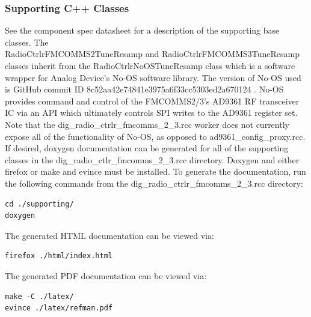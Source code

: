 \documentclass{article}
\def\comp{dig\_radio\_ctrlr\_fmcomms\_2\_3}
\begin{document}
    \subsubsection{Supporting C++ Classes}
      See the component spec
      datasheet \cite{dig_radio_ctrlr_comp_datasheet}
      for a description of the supporting base classes.
      The \\ RadioCtrlrFMCOMMS2TuneResamp and
      RadioCtrlrFMCOMMS3TuneResamp classes inherit from the
      RadioCtrlrNoOSTuneResamp class which is
      a software wrapper for Analog Device's No-OS software
      library\cite{no_os}.
      The version of No-OS used is GitHub commit ID
      8c52aa42e74841e3975a6f33cc5303ed2a670124 \cite{no_os_8c52aa42e74841e3975a6f33cc5303ed2a670124}.
      No-OS provides command and control of the FMCOMMS2/3's AD9361
      RF transceiver IC\cite{ad9361} via an
      API which ultimately controls SPI writes to the
      AD9361 register
      set. Note that the \comp.rcc worker does not currently
      expose all of the
      functionality
      of No-OS, as opposed to
      ad9361\_config\_proxy.rcc\cite{ad9361_config_proxy_datasheet}.
    If desired, doxygen documentation can be generated for all
    of the supporting classes in the dig\_radio\_ctlr\_fmcomms\_2\_3.rcc
    directory. Doxygen and
    either firefox or make and evince
    must be installed. To generate
    the documentation, run the following commands from the
    dig\_radio\_ctrlr\_fmcomms\_2\_3.rcc directory:
    \begin{lstlisting}
cd ./supporting/
doxygen
    \end{lstlisting}
The generated HTML documentation can be viewed via:
    \begin{lstlisting}
firefox ./html/index.html
    \end{lstlisting}
The generated PDF documentation can be viewed via:
    \begin{lstlisting}
make -C ./latex/
evince ./latex/refman.pdf
    \end{lstlisting}
\end{document}
